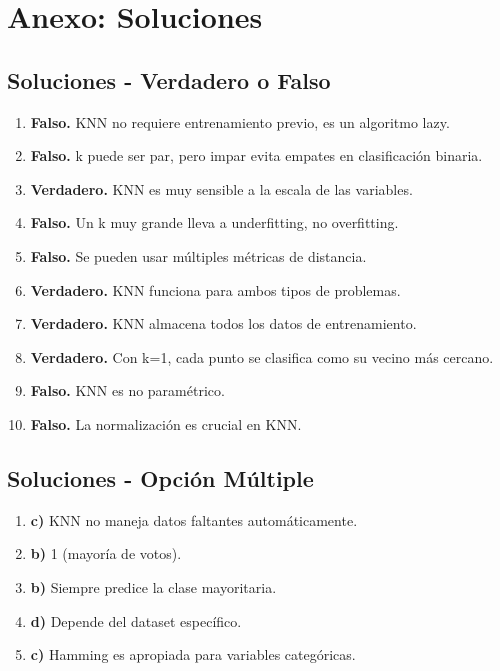 \documentclass[12pt]{article}
\begin{document}
\newpage

\section{Anexo: Soluciones}

\subsection{Soluciones - Verdadero o Falso}

\begin{enumerate}
    \item \textbf{Falso.} KNN no requiere entrenamiento previo, es un algoritmo lazy.
    \item \textbf{Falso.} k puede ser par, pero impar evita empates en clasificación binaria.
    \item \textbf{Verdadero.} KNN es muy sensible a la escala de las variables.
    \item \textbf{Falso.} Un k muy grande lleva a underfitting, no overfitting.
    \item \textbf{Falso.} Se pueden usar múltiples métricas de distancia.
    \item \textbf{Verdadero.} KNN funciona para ambos tipos de problemas.
    \item \textbf{Verdadero.} KNN almacena todos los datos de entrenamiento.
    \item \textbf{Verdadero.} Con k=1, cada punto se clasifica como su vecino más cercano.
    \item \textbf{Falso.} KNN es no paramétrico.
    \item \textbf{Falso.} La normalización es crucial en KNN.
\end{enumerate}

\subsection{Soluciones - Opción Múltiple}

\begin{enumerate}
    \item \textbf{c)} KNN no maneja datos faltantes automáticamente.
    \item \textbf{b)} 1 (mayoría de votos).
    \item \textbf{b)} Siempre predice la clase mayoritaria.
    \item \textbf{d)} Depende del dataset específico.
    \item \textbf{c)} Hamming es apropiada para variables categóricas.
\end{enumerate}
\end{document}
